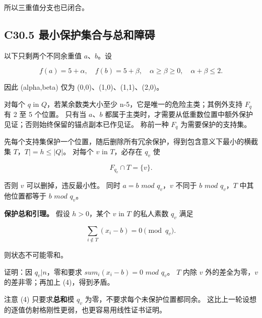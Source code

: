 \documentclass[11pt,a4paper]{article}
\theoremstyle{definition}
\numberwithin{equation}{section}
\begin{document}
{所以三重值分支也已闭合。}

\subsection*{\texorpdfstring{{C30.5} {最小保护集合与总和障碍}}{C30.5 最小保护集合与总和障碍}}\label{C30-h195}

{以下只剩两个不同余重值} {\ensuremath{a}、\ensuremath{b}。设}

\[
f(a)=5+\alpha,\quad f(b)=5+\beta,
\quad\alpha\ge\beta\ge0,\quad\alpha+\beta\le2.
\tag{C30.2}
\]

{因此} {(alpha,beta)} {仅为} {(0,0)、(1,0)、(1,1)、(2,0)。}

{对每个} {\ensuremath{q}} {in} {\ensuremath{Q}，若某余数类大小至少} {n-5，它是唯一的危险主类；其例外支持} {\ensuremath{F_{q}}} {有} {2} {至} {5} {个位置。} {只有当} {\ensuremath{a}、\ensuremath{b}} {都属于主类时，才需要从低重数位置中额外保护见证；否则始终保留的锚点副本已作见证。} {称前一种} {\ensuremath{F_{q}}} {为需要保护的支持集。}

{先每个支持集保护一个位置，随后删除所有冗余保护，得到包含意义下最小的横截集} {\ensuremath{T}，\textbar{}\ensuremath{T|=h\le |Q|}。} {对每个} {\ensuremath{v}} {in} {\ensuremath{T}，必存在} {\ensuremath{q_{v}}} {使}

\[
F_{q_v}\cap T=\{v\}.
\tag{C30.3}
\]

{否则} {\ensuremath{v}} {可以删掉，违反最小性。} {同时} {\ensuremath{a=b}} {\ensuremath{mod}} {\ensuremath{q_{v}}，\ensuremath{v}} {不同于} {\ensuremath{b}} {\ensuremath{mod}} {\ensuremath{q_{v}}，\ensuremath{T}} {中其他位置都等于} {\ensuremath{b}} {\ensuremath{mod}} {\ensuremath{q_{v}}。}

\textbf{{保护总和引理。}} {假设} {\ensuremath{h>0}，某个} {\ensuremath{v}} {in} {\ensuremath{T}} {的私人素数} {\ensuremath{q_{v}}} {满足}

\[
\sum_{i\notin T}(x_i-b)=0\pmod{q_v}.
\tag{C30.4}
\]

{则状态不可能零和。}

{证明：因} {\ensuremath{q_{v}|n}，零和要求} {\ensuremath{sum_{i}(x_{i}-b)=0}} {\ensuremath{mod}} {\ensuremath{q_{v}}。} {\ensuremath{T}} {内除} {\ensuremath{v}} {外的差全为零，\ensuremath{v}} {的差非零；再加上} {(4)，得到矛盾。}

{注意} {(4)} {只要求}\textbf{{总和}}{模} {\ensuremath{q_{v}}} {为零，不要求每个未保护位置都同余。} {这比上一轮设想的逐值仿射格刚性更弱，也更容易用线性证书证明。}
\end{document}
